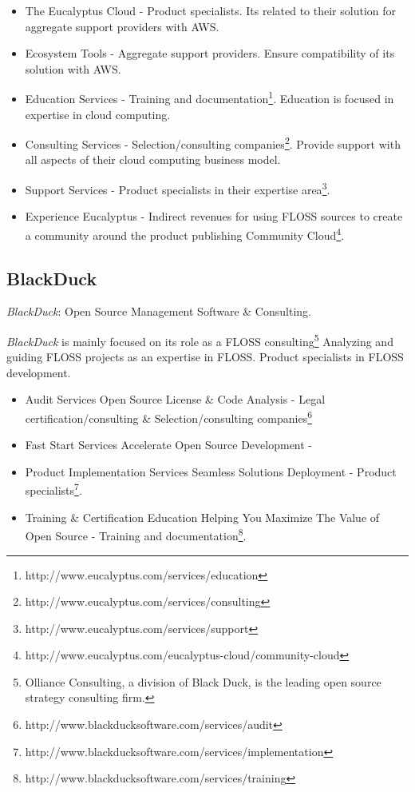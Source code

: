\documentclass[11pt]{scrartcl}
\begin{document}
\begin{itemize}
	\item The Eucalyptus Cloud - Product specialists. Its related to their solution for aggregate support providers with AWS.
	\item Ecosystem Tools - Aggregate support providers. Ensure compatibility of its solution with AWS.
	\item Education Services - Training and documentation\footnote{http://www.eucalyptus.com/services/education}. Education is focused in expertise in cloud computing. 
	\item Consulting Services - Selection/consulting companies\footnote{http://www.eucalyptus.com/services/consulting}. Provide support with all aspects of their cloud computing business model.
	\item Support Services - Product specialists in their expertise area\footnote{http://www.eucalyptus.com/services/support}.
	\item Experience Eucalyptus - Indirect revenues for using FLOSS sources to create a community around the product publishing Community Cloud\footnote{http://www.eucalyptus.com/eucalyptus-cloud/community-cloud}.
\end{itemize}

\subsection{BlackDuck}

\par \emph{BlackDuck}: Open Source Management Software \& Consulting.

\par \emph{BlackDuck} is mainly focused on its role as a FLOSS consulting\footnote{Olliance Consulting, a division of Black Duck, is the leading open source strategy consulting firm.} Analyzing and guiding FLOSS projects as an expertise in FLOSS. Product specialists in FLOSS development.

\begin{itemize}
	\item Audit Services Open Source License \& Code Analysis - Legal certification/consulting \& Selection/consulting companies\footnote{http://www.blackducksoftware.com/services/audit}
	\item Fast Start Services Accelerate Open Source Development - 
	\item Product Implementation Services Seamless Solutions Deployment - Product specialists\footnote{http://www.blackducksoftware.com/services/implementation}.
	\item Training \& Certification Education Helping You Maximize The Value of Open Source - Training and documentation\footnote{http://www.blackducksoftware.com/services/training}.
\end{itemize}
\end{document}
